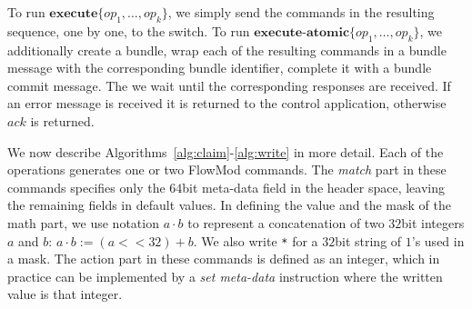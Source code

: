 \documentclass[conference]{sigcomm-alternate}
\newcommand{\hide}[1]{}
\newcommand{\concat}[0]{\cdot}
\newcommand{\add}{\textbf{add}\xspace}
\newcommand{\dele}{\textbf{delete}\xspace}
\newcommand{\checko}{\texttt{check\_overlap}\xspace}
\newcommand{\exec}{\textbf{execute}}
\newcommand{\execatomic}{\textbf{execute-atomic}}
\newcommand{\ack}{\textit{ack}}
\begin{document}
To run  $\exec\{op_1,\ldots,op_k\}$, we simply send the commands in
the resulting sequence, one by one, to the switch. 
%
To run  $\execatomic\{op_1,\ldots,op_k\}$, we 
additionally create a bundle, wrap each of the resulting commands in a
bundle message with the corresponding bundle identifier, complete it
with a bundle commit message.
The we wait until the
corresponding responses are received. 
If an error message is received
it is returned to the control application,
otherwise $\ack$ is returned.

We now describe Algorithms~\ref{alg:claim}-\ref{alg:write} in more
detail. 
Each of the operations generates one or two FlowMod commands. 
The \textit{match} part in these commands specifies only the $64$bit meta-data
field in the header space, leaving the remaining fields in default
values.  
In defining the value and the mask of the math part, we 
use notation $a\concat b$ to represent a concatenation of two
$32$bit integers $a$ and $b$: $a\concat b := (a<<32)+b$.
We also write \texttt{*} for  a $32$bit 
string of $1$'s used in a mask.  
%
The action part in these commands is defined as an integer, which in
practice can be implemented by a \emph{set meta-data} instruction where the written value is that integer.


\hide{
To simplify the presentation we set the FlowMod command field values with integers, according to the following guidelines:
\begin{itemize}

\item {\bf  Flag:} we often use the $\checko$ optional flag value to make the command execution dependent on switch state. In other cases, when the flag value remains zero, we omit the assignment.

\item {\bf  Match:} we consider the match part of an entry to be a ternary string of bounded length, represented by binary strings (integers) named value and mask. In general, the match can be applied to any set of supported packet header fields. In our implementation, the $64$bit meta-data field alone is sufficient. We sometimes use the concatenation of two $32$bit integers, denoted by $a\concat b$, to form one match value or mask, where $a\concat b := (a<<32)+b$.

\item {\bf Action:} we consider the action part of an entry to be an integer, which in practice can be implemented by a \emph{set meta-data} instruction where the written value is that integer.

\end{itemize} 

In addition we use "op" as shortened form to a field that indicates whether the command should $\add$ or $\dele$ the specified flow entry. This corresponds to the FlowMod field named "command" which can receive values \textt{ofpfc\_add} and \texttt{ofpfc\_delete}.
}
\end{document}
